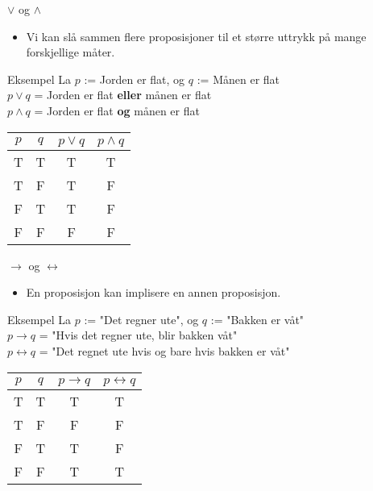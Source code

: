 \begin{frame}{$\lor$ og $\land$}
    \begin{itemize}
        \item Vi kan slå sammen flere proposisjoner til et større uttrykk på mange forskjellige måter.
    \end{itemize}
    \begin{block}{Eksempel}
        La $p$ := Jorden er flat, og $q$ := Månen er flat\\
        $p \lor q$ = Jorden er flat \textbf{eller} månen er flat\\
        $p \land q$ = Jorden er flat \textbf{og} månen er flat\\
    \end{block}
    \begin{tabular}{c|c|c|c}
        $p$ & $q$ & $p \lor q$ & $p \land q$ \\ \hline
        T & T & T & T \\
        T & F & T & F \\
        F & T & T & F \\
        F & F & F & F \\
    \end{tabular}
\end{frame}

\begin{frame}{$\rightarrow$ og $\leftrightarrow$}
    \begin{itemize}
        \item En proposisjon kan implisere en annen proposisjon.
    \end{itemize}
    \begin{block}{Eksempel}
        La $p$ := "Det regner ute", og $q$ := "Bakken er våt"\\
        $p \rightarrow q$ = "Hvis det regner ute, blir bakken våt"\\
        $p \leftrightarrow q$ = "Det regnet ute hvis og bare hvis bakken er våt"
    \end{block}
    \begin{tabular}{c|c|c|c}
        $p$ & $q$ & $p \rightarrow q$ & $p \leftrightarrow q$ \\ \hline
        T & T & T & T \\
        T & F & F & F \\
        F & T & T & F \\
        F & F & T & T \\
    \end{tabular}
\end{frame}

